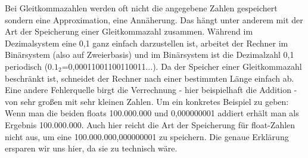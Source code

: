 Bei Gleitkommazahlen werden oft nicht die angegebene Zahlen gespeichert sondern eine Approximation, eine Annäherung. Das hängt unter anderem mit der Art der Speicherung einer Gleitkommazahl zusammen. Während im Dezimalsystem eine 0,1 ganz einfach darzustellen ist, arbeitet der Rechner im Binärsystem (also auf Zweierbasis) und im Binärsystem ist die Dezimalzahl 0,1 periodisch ($0.1_2$=0,00011001100110011...). Da der Speicher einer Gleitkommazahl beschränkt ist, schneidet der Rechner nach einer bestimmten Länge einfach ab.
\\Eine andere Fehlerquelle birgt die Verrechnung - hier beispielhaft die Addition - von sehr großen mit sehr kleinen Zahlen. Um ein konkretes Beispiel zu geben: Wenn man die beiden floats 100.000.000 und 0,000000001 addiert erhält man als Ergebnis 100.000.000. Auch hier reicht die Art der Speicherung für float-Zahlen nicht aus, um eine 100.000.000,000000001 zu speichern. Die genaue Erklärung ersparen wir uns hier, da sie zu technisch wäre.